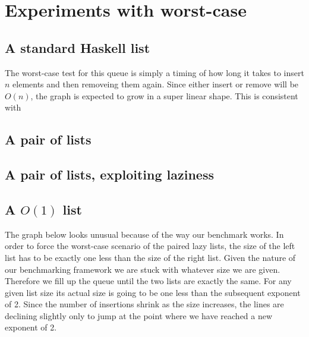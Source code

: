 \section*{Experiments with worst-case}

\subsection*{A standard Haskell list}
The worst-case test for this queue is simply a timing of how long it takes to insert $n$ elements and then removeing them again. Since either insert or remove will be $O(n)$, the graph is expected to grow in a super linear shape. This is consistent with 
\subsection*{A pair of lists}
\subsection*{A pair of lists, exploiting laziness}
\subsection*{A $O(1)$ list}




The graph below looks unusual because of the way our benchmark works. In order to force the worst-case scenario of the paired lazy lists, the size of the left list has to be exactly one less than the size of the right list. Given the nature of our benchmarking framework we are stuck with whatever size we are given. Therefore we fill up the queue until the two lists are exactly the same. For any given list size its actual size is going to be one less than the subsequent exponent of 2. Since the number of insertions shrink as the size increases, the lines are declining slightly only to jump at the point where we have reached a new exponent of 2.




